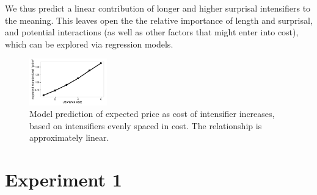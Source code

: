 \documentclass[10pt,letterpaper]{article}
\begin{document}
We thus predict  a linear contribution of longer and higher surprisal intensifiers to the meaning. 
This leaves open the the relative importance of length and surprisal, and potential interactions (as well as other factors that might enter into cost), which can be explored via regression models.


\begin{figure}[ht]
\begin{center}
\includegraphics[width=0.3\textwidth]{analysis_files_for_writeup/images/height-by-cost.pdf}
\end{center}
\caption{Model prediction of expected price as cost of intensifier increases, based on intensifiers evenly spaced in cost. The relationship is approximately linear.} 
\label{model-heights}
\end{figure}

\section{Experiment 1}
\end{document}
